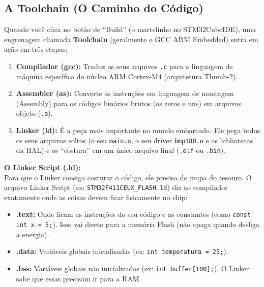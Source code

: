 \documentclass[12pt,a4paper]{article}
\begin{document}
\subsection{A Toolchain (O Caminho do Código)}
Quando você clica no botão de ``Build'' (o martelinho no STM32CubeIDE), uma engrenagem chamada \textbf{Toolchain} (geralmente o GCC ARM Embedded) entra em ação em três etapas:



\begin{enumerate}
    \item \textbf{Compilador (gcc):} Traduz os seus arquivos \texttt{.c} para a linguagem de máquina específica do núcleo ARM Cortex-M4 (arquitetura Thumb-2).
    \item \textbf{Assembler (as):} Converte as instruções em linguagem de montagem (Assembly) para os códigos binários brutos (os zeros e uns) em arquivos objeto (\texttt{.o}).
    \item \textbf{Linker (ld):} É a peça mais importante no mundo embarcado. Ele pega todos os seus arquivos soltos (o seu \texttt{main.o}, o seu driver \texttt{bmp180.o} e as bibliotecas da HAL) e os ``costura'' em um único arquivo final (\texttt{.elf} ou \texttt{.bin}).
\end{enumerate}

\textbf{O Linker Script (.ld):}\\
Para que o Linker consiga costurar o código, ele precisa do mapa do tesouro. O arquivo Linker Script (ex: \texttt{STM32F411CEUX\_FLASH.ld}) diz ao compilador exatamente onde as coisas devem ficar fisicamente no chip:
\begin{itemize}
    \item \textbf{.text:} Onde ficam as instruções do seu código e as constantes (como \texttt{const int x = 5;}). Isso vai direto para a memória Flash (não apaga quando desliga a energia).
    \item \textbf{.data:} Variáveis globais inicializadas (ex: \texttt{int temperatura = 25;}).
    \item \textbf{.bss:} Variáveis globais não inicializadas (ex: \texttt{int buffer[100];}). O Linker sabe que essas precisam ir para a RAM.
\end{itemize}
\end{document}
